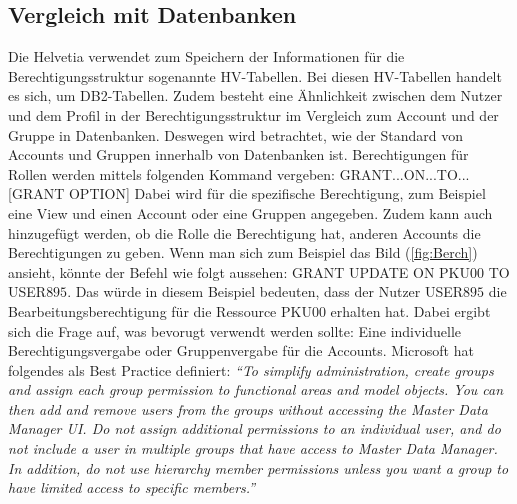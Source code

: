 \subsection{Vergleich mit Datenbanken}
\label{sec:chapter04:DB}
Die Helvetia verwendet zum Speichern der Informationen für die Berechtigungsstruktur sogenannte HV-Tabellen.
Bei diesen HV-Tabellen handelt es sich, um DB2-Tabellen.
Zudem besteht eine Ähnlichkeit zwischen dem Nutzer und dem Profil in der Berechtigungsstruktur im Vergleich zum Account und der Gruppe in Datenbanken.
Deswegen wird betrachtet, wie der Standard von Accounts und Gruppen innerhalb von Datenbanken ist.
\newline
Berechtigungen für Rollen werden mittels folgenden Kommand vergeben: 
\newline
\newline
GRANT...ON...TO...[GRANT OPTION]
\newline
\newline
Dabei wird für die spezifische Berechtigung, zum Beispiel eine View und einen Account oder eine Gruppen angegeben.
Zudem kann auch hinzugefügt werden, ob die Rolle die Berechtigung hat, anderen Accounts die Berechtigungen zu geben.\cite{Ram09, S.474-475}
\newline
Wenn man sich zum Beispiel das Bild (\ref{fig:Berch}) ansieht, könnte der Befehl wie folgt aussehen:
\newline
\newline
GRANT UPDATE ON PKU$00$ TO USER$895$.
\newline
\newline
Das würde in diesem Beispiel bedeuten, dass der Nutzer USER$895$ die Bearbeitungsberechtigung für die Ressource PKU00 erhalten hat.
Dabei ergibt sich die Frage auf, was bevorugt verwendt werden sollte:
\newline
Eine individuelle Berechtigungsvergabe oder Gruppenvergabe für die Accounts.
Microsoft hat folgendes als Best Practice definiert:
\newline
\newline
\textit{"`To simplify administration, create groups and assign each group permission to functional areas and model objects.
You can then add and remove users from the groups without accessing the Master Data Manager UI.
\newline
\newline
Do not assign additional permissions to an individual user, and do not include a user in multiple groups that have access to Master Data Manager. In addition, do not use hierarchy member permissions unless you want a group to have limited access to specific members."'} \cite{Micro}
